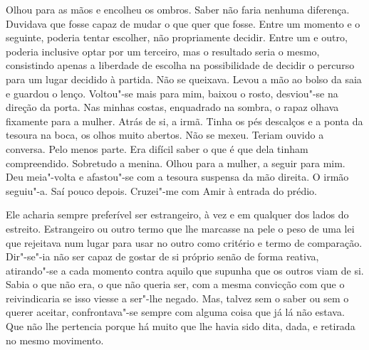 Olhou para as mãos e encolheu os ombros. Saber não faria nenhuma
diferença. Duvidava que fosse capaz de mudar o que quer que fosse. Entre
um momento e o seguinte, poderia tentar escolher, não propriamente
decidir. Entre um e outro, poderia inclusive optar por um terceiro, mas
o resultado seria o mesmo, consistindo apenas a liberdade de escolha na
possibilidade de decidir o percurso para um lugar decidido à partida.
Não se queixava. Levou a mão ao bolso da saia e guardou o lenço.
Voltou"-se mais para mim, baixou o rosto, desviou"-se na direção da
porta. Nas minhas costas, enquadrado na sombra, o rapaz olhava fixamente
para a mulher. Atrás de si, a irmã. Tinha os pés descalços e a ponta da
tesoura na boca, os olhos muito abertos. Não se mexeu. Teriam ouvido a
conversa. Pelo menos parte. Era difícil saber o que é que dela tinham
compreendido. Sobretudo a menina. Olhou para a mulher, a seguir para
mim. Deu meia"-volta e afastou"-se com a tesoura suspensa da mão
direita. O irmão seguiu"-a. Saí pouco depois. Cruzei"-me com Amir à
entrada do prédio.

Ele acharia sempre preferível ser estrangeiro, à vez e em qualquer dos
lados do estreito. Estrangeiro ou outro termo que lhe marcasse na pele o
peso de uma lei que rejeitava num lugar para usar no outro como critério
e termo de comparação. Dir"-se"-ia não ser capaz de gostar de si próprio
senão de forma reativa, atirando"-se a cada momento contra aquilo que
supunha que os outros viam de si. Sabia o que não era, o que não queria
ser, com a mesma convicção com que o reivindicaria se isso viesse a
ser"-lhe negado. Mas, talvez sem o saber ou sem o querer aceitar,
confrontava"-se sempre com alguma coisa que já lá não estava. Que não
lhe pertencia porque há muito que lhe havia sido dita, dada, e retirada
no mesmo movimento.

